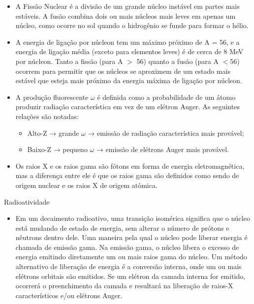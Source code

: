 \documentclass[11pt,a4paper]{article}
\newcounter{exemplo}
\begin{document}
\begin{exemplo}
\begin{itemize}
        \item A Fissão Nuclear é a divisão de um grande núcleo instável em partes mais estáveis. A fusão combina dois ou mais núcleos mais leves em apenas um núcleo, como ocorre no sol quando o hidrogênio se funde para formar o hélio.
        
        \item A energia de ligação por núcleon tem um máximo próximo de A = 56, e a energia de ligação média (exceto para elementos leves) é de cerca de 8 MeV por núcleon. Tanto a fissão (para A $>$ 56) quanto a fusão (para A $<$56) ocorrem para permitir que os núcleos se aproximem de um estado mais estável que esteja mais próximo da energia máxima de ligação por núcleon.
        
        \item A produção fluorescente $\omega$ é definida como a probabilidade de um átomo produzir radiação característica em vez de um elétron Auger. As seguintes relações são notadas:
            \begin{itemize}
                \item Alto-Z → grande $\omega$ → emissão de radiação característica mais provável;
                \item Baixo-Z → pequeno $\omega$ → emissão de elétrons Auger mais provável.
            \end{itemize}
           
       \item Os raios X e os raios gama são fótons em forma de energia eletromagnética, mas a diferença entre ele é que os raios gama são definidos como sendo de origem nuclear e os raios X de origem atômica.
       
       
    \end{itemize}

    \textcolor{CarnationPink}{Radioatividade}

    \begin{itemize}
        \item Em um decaimento radioativo, uma transição isomérica significa que o núcleo está mudando de estado de energia, sem alterar o número de prótons e nêutrons dentro dele. Uma maneira pela qual o núcleo pode liberar energia é chamada de emissão gama. Na emissão gama, o núcleo libera o excesso de energia emitindo diretamente um ou mais raios gama do núcleo. Um método alternativo de liberação de energia é a conversão interna, onde um ou mais elétrons orbitais são emitidos. Se um elétron da camada interna for emitido, ocorrerá o preenchimento da camada e resultará na liberação de raios-X característicos e/ou elétrons Auger.
       

\end{itemize}
\end{exemplo}
\end{document}
